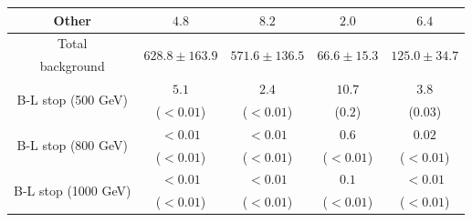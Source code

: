 \begin{table}
{\begin{tabular}{c|cccc}
      Other                                  & $4.8$                              & $8.2$                              & $2.0$                            & $6.4$                 \\
      \midrule
      Total                                  & \multirow{2}{*}{$628.8 \pm 163.9$} & \multirow{2}{*}{$571.6 \pm 136.5$} & \multirow{2}{*}{$66.6 \pm 15.3$} & \multirow{2}{*}{$125.0 \pm 34.7$}               \\
      background                             &                                    &                                    &                                  & \\
      \midrule
      \multirow{2}{*}{B-L stop (500 GeV)}    & $5.1$                              & $2.4$                              & $10.7$                           & $3.8$                 \\
                                             & ($< 0.01$)                         & ($<0.01$)                          & ($0.2$)                          & ($0.03$) \vspace{1ex} \\
      \multirow{2}{*}{B-L stop (800 GeV)}    & $< 0.01$                           & $< 0.01$                           & $0.6$                            & $0.02$   \\
                                             & ($< 0.01$)                         & ($< 0.01$)                         & ($< 0.01$)                       & ($< 0.01$) \vspace{1ex} \\
      \multirow{2}{*}{B-L stop (1000 GeV)}   & $< 0.01$                           & $< 0.01$                           & $0.1$                            & $< 0.01$                     \\
                                             & ($< 0.01$)                         & ($< 0.01$)                         & ($< 0.01$)                       & ($< 0.01$)
      \vspace{1ex} \\
      \bottomrule
    \end{tabular}

  }
\end{table}


